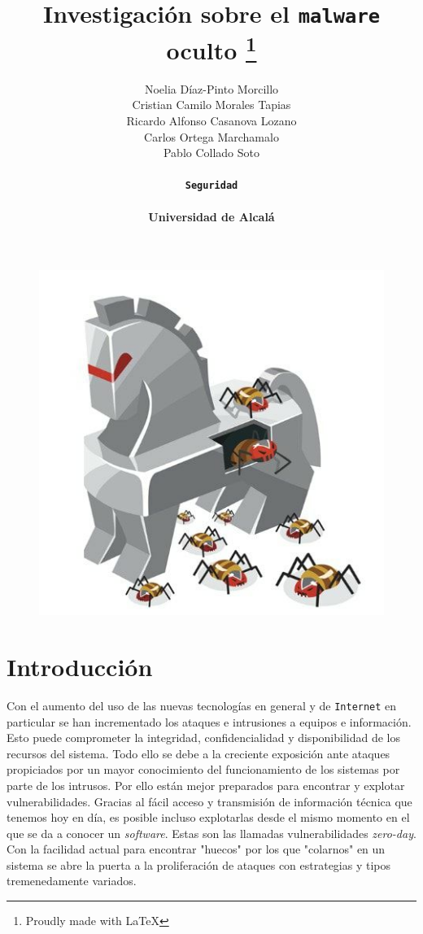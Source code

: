 \documentclass[12pt]{article}
\title{Investigación sobre el \texttt{malware} oculto \thanks{Proudly made with \LaTeX}}
\author{Noelia Díaz-Pinto Morcillo \\ Cristian Camilo Morales Tapias \\ Ricardo Alfonso Casanova Lozano \\ Carlos Ortega Marchamalo \\ Pablo Collado Soto \\ \\ \textbf{\texttt{Seguridad}} \\ \\ \textbf{Universidad de Alcalá}}
\date{}
\newcommand{\newpar} {
    \vskip 0.5cm
}
\begin{document}
    \begin{titlingpage}
        \maketitle
        \begin{figure}[!htb]
            \centering
            \includegraphics[width=0.6\linewidth]{cover_pic.jpg}
        \end{figure}
    \end{titlingpage}

    \newpage
    \tableofcontents
    \newpage

    \section{Introducción}
        Con el aumento del uso de las nuevas tecnologías en general y de \texttt{Internet} en particular se han incrementado los ataques e intrusiones a equipos e información. Esto puede comprometer la integridad, confidencialidad y disponibilidad de los recursos del sistema. Todo ello se debe a la creciente exposición ante ataques propiciados por un mayor conocimiento del funcionamiento de los sistemas por parte de los intrusos. Por ello están mejor preparados para encontrar y explotar vulnerabilidades. Gracias al fácil acceso y transmisión de información técnica que tenemos hoy en día, es posible incluso explotarlas desde el mismo momento en el que se da a conocer un \textit{software}. Estas son las llamadas vulnerabilidades \textit{zero-day}. Con la facilidad actual para encontrar "huecos" por los que "colarnos" en un sistema se abre la puerta a la proliferación de ataques con estrategias y tipos tremenedamente variados.

        \newpar
\end{document}
